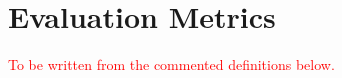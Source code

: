 \documentclass[a4paper,10pt]{article}
\newcommand{\todo}[1]{\textcolor{red}{#1}}
\begin{document}
\section{Evaluation Metrics}
\label{app:metrics}

\todo{To be written from the commented definitions below.}

 



\end{document}
